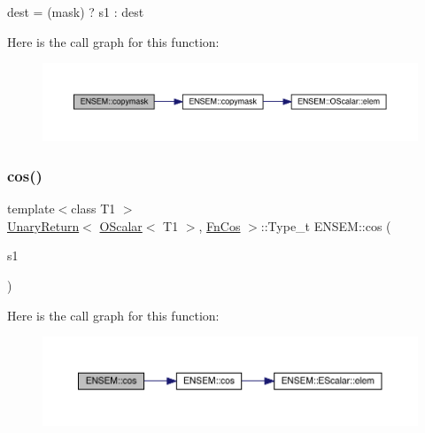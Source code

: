 dest = (mask) ? s1 \+: dest 

Here is the call graph for this function\+:\nopagebreak
\begin{figure}[H]
\begin{center}
\leavevmode
\includegraphics[width=350pt]{d1/d71/group__obsscalar_gada3c474cf374d31a9df7c6cba2d608eb_cgraph}
\end{center}
\end{figure}
\mbox{\label{group__obsscalar_gab03cd6386bf0623d4effce724af5c124}} 
\subsubsection{\texorpdfstring{cos()}{cos()}}
{\footnotesize\ttfamily template$<$class T1 $>$ \\
\mbox{\hyperlink{structENSEM_1_1UnaryReturn}{Unary\+Return}}$<$ \mbox{\hyperlink{classENSEM_1_1OScalar}{O\+Scalar}}$<$ T1 $>$, \mbox{\hyperlink{structENSEM_1_1FnCos}{Fn\+Cos}} $>$\+::Type\+\_\+t E\+N\+S\+E\+M\+::cos (\begin{DoxyParamCaption}\item[{const \mbox{\hyperlink{classENSEM_1_1OScalar}{O\+Scalar}}$<$ T1 $>$ \&}]{s1 }\end{DoxyParamCaption})\hspace{0.3cm}{\ttfamily [inline]}}

Here is the call graph for this function\+:\nopagebreak
\begin{figure}[H]
\begin{center}
\leavevmode
\includegraphics[width=350pt]{d1/d71/group__obsscalar_gab03cd6386bf0623d4effce724af5c124_cgraph}
\end{center}
\end{figure}
\mbox{\label{group__obsscalar_ga6e281512474808f7e211836b3d6607f3}} 
